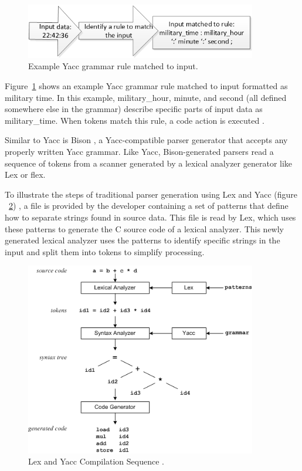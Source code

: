 \begin{figure}[htbp]
\centering
\includegraphics[width=0.9\textwidth]{figures/YaccGrammarRule.png}
\caption{Example Yacc grammar rule matched to input.}
\label{fig:YaccGrammarRule}
\end{figure}

\indent
Figure~\ref{fig:YaccGrammarRule} shows an example Yacc grammar rule matched to input formatted as military time.  In this example, military\_hour, minute, and second (all defined somewhere else in the grammar) describe specific parts of input data as military\_time.  When tokens match this rule, a code action is executed \cite{johnson_01,niemann_01}.

\indent
Similar to Yacc is Bison \cite{aycock_01,demaille_01}, a Yacc-compatible parser generator that accepts any properly written Yacc grammar.  Like Yacc, Bison-generated parsers read a sequence of tokens from a scanner generated by a lexical analyzer generator like Lex or flex.

\indent
To illustrate the steps of traditional parser generation using Lex and Yacc (figure ~\ref{fig:LexAndYaccCompileSequence}) \cite{johnson_01,lesk_01,niemann_01}, a file is provided by the developer containing a set of patterns that define how to separate strings found in source data.  This file is read by Lex, which uses these patterns to generate the C source code of a lexical analyzer.  This newly generated lexical analyzer uses the patterns to identify specific strings in the input and split them into tokens to simplify processing.

\begin{figure}[htbp]
\centering
\includegraphics[width=0.9\textwidth]{figures/LexAndYaccCompileSequence.png}
\caption[Lex and Yacc Compilation Sequence]{Lex and Yacc Compilation Sequence \cite{niemann_01}.}
\label{fig:LexAndYaccCompileSequence}
\end{figure}

